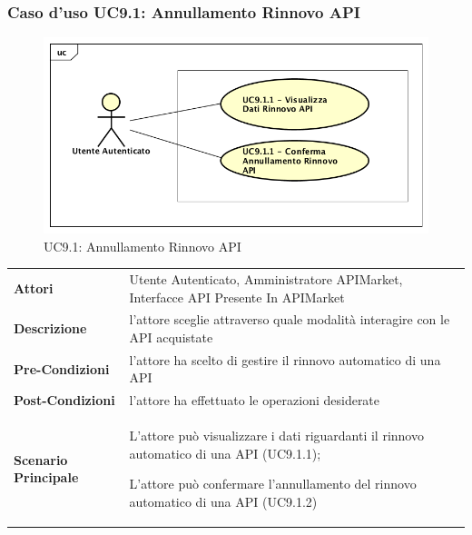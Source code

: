 \newpage
\subsubsection{Caso d'uso UC9.1: Annullamento Rinnovo API}
\label{UC9.1}
\begin{figure}[ht]
	\centering
	\includegraphics[scale=0.45]{UML/UC9_1.png}
	\caption{UC9.1: Annullamento Rinnovo API}
\end{figure}
\FloatBarrier
\renewcommand*{\arraystretch}{1.6}
\begin{longtable}{ l | p{11cm}}
	\hline
	\rowcolor{Gray}
	\multicolumn{2}{c}{UC9.1: Annullamento Rinnovo API} \\
	\hline
	\textbf{Attori} &Utente Autenticato, Amministratore APIMarket, Interfacce API Presente In APIMarket \\
	\textbf{Descrizione} & l'attore sceglie attraverso quale modalità interagire con le API acquistate \\
	\textbf{Pre-Condizioni} & l'attore ha scelto di gestire il rinnovo automatico di una API\\
	\textbf{Post-Condizioni}&l'attore ha effettuato le operazioni desiderate\\
	\textbf{Scenario Principale} & \begin{enumerate*}[label=(\arabic*.),itemjoin={\newline}]
		\item L'attore può visualizzare i dati riguardanti il rinnovo automatico di una API (UC9.1.1);
		\item L'attore può confermare l'annullamento del rinnovo automatico di una API (UC9.1.2)
	\end{enumerate*}\\
\end{longtable}

